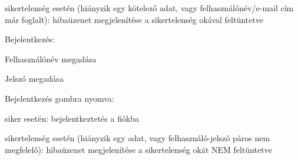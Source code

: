 \begin{compactitem}
\begin{compactitem}
\begin{compactitem}
			\item sikertelenség esetén (hiányzik egy kötelező adat, vagy felhasználónév/e-mail cím már foglalt): hibaüzenet megjelenítése a sikertelenség okával feltüntetve
		\end{compactitem}
	\end{compactitem}
	\item Bejelentkezés:
	\begin{compactitem}
		\item Felhasználónév megadása
		\item Jelszó megadása
		\item Bejelentkezés gombra nyomva:
		\begin{compactitem}
			\item siker esetén: bejelentkeztetés a fiókba
			\item sikertelenség esetén (hiányzik egy adat, vagy felhasználó-jelszó páros nem megfelelő): hibaüzenet megjelenítése a sikertelenség okát NEM feltüntetve
		\end{compactitem}
	\end{compactitem}
\end{compactitem}

